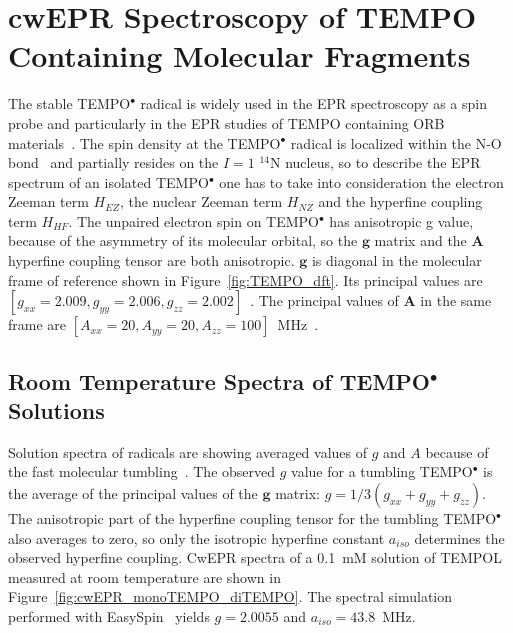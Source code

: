 \section{cwEPR Spectroscopy of TEMPO Containing Molecular Fragments}
The stable TEMPO$^\bullet$ radical is widely used in the EPR spectroscopy as a spin probe and particularly in the EPR studies of TEMPO containing ORB materials~\cite{nakahara2002_cpl, nishide2004_electact, bahaceci2013_jpowersources, aydin2015_jsoistatelect, khodeir2019_softmatter, Zhang2018}. The spin density at the TEMPO$^\bullet$ radical is localized within the N-O bond~\cite{Owenius2001} and partially resides on the $I=1$ $^{14}$N nucleus, so to describe the EPR spectrum of an isolated TEMPO$^\bullet$ one has to take into consideration the electron Zeeman term $H_{EZ}$, the nuclear Zeeman term $H_{NZ}$ and the hyperfine coupling term $H_{HF}$. The unpaired electron spin on TEMPO$^\bullet$ has anisotropic g value, because of the asymmetry of its molecular orbital, so the $\textbf{g}$ matrix and the $\textbf{A}$ hyperfine coupling tensor are both anisotropic. $\textbf{g}$ is diagonal in the molecular frame of reference shown in Figure~\ref{fig:TEMPO_dft}. Its principal values are $\left[g_{xx}=2.009,g_{yy}=2.006,g_{zz}=2.002\right]$~\cite{Liu_2008,Bordignon2017}. The principal values of $\textbf{A}$ in the same frame are $\left[A_{xx}=20,A_{yy}=20,A_{zz}=100\right]$~MHz~\cite{Liu_2008,Bordignon2017}.

\subsection{Room Temperature Spectra of TEMPO$^{\bullet}$ Solutions}
Solution spectra of radicals are showing averaged values of $g$ and $A$ because of the fast molecular tumbling~\cite{Liu_2008,Carrington_solution_epr}. The observed $g$ value for a tumbling TEMPO$^{\bullet}$ is the average of the principal values of the $\textbf{g}$ matrix: $g = 1/3\left(g_{xx}+g_{yy}+g_{zz}\right)$. The anisotropic part of the hyperfine coupling tensor for the tumbling TEMPO$^{\bullet}$ also averages to zero, so only the isotropic hyperfine constant $a_{iso}$ determines the observed hyperfine coupling. CwEPR spectra of a 0.1~mM solution of TEMPOL measured at room temperature are shown in Figure~\ref{fig:cwEPR_monoTEMPO_diTEMPO}. The spectral simulation performed with EasySpin~\cite{Easyspin} yields $g=2.0055$ and $a_{iso}=43.8$~MHz.

